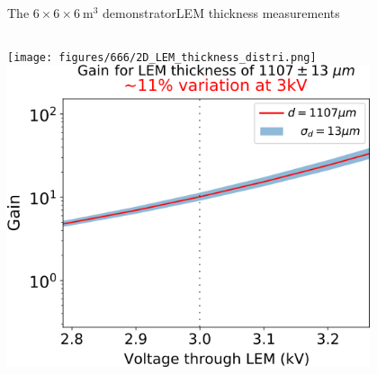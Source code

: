 \documentclass[10pt]{beamer}
\begin{document}
\begin{frame}{The \texorpdfstring{$6 \times 6 \times \SI{6}{\meter\cubed}$}{666} demonstrator}{LEM thickness measurements}
\begin{scriptsize}
\begin{columns}
\begin{column}{0.48\textwidth}
    				\texttt{[image: figures/666/2D\_LEM\_thickness\_distri.png]}\\\vspace{0.1cm}
    				\vspace{0.3cm}
    				\centering
    				\includegraphics[width=0.8\textwidth]{figures/666/measured_gain_fluctuations.png}
    			\end{column}
    		\end{columns}
    	\end{scriptsize}
    \end{frame}
    
\end{document}

